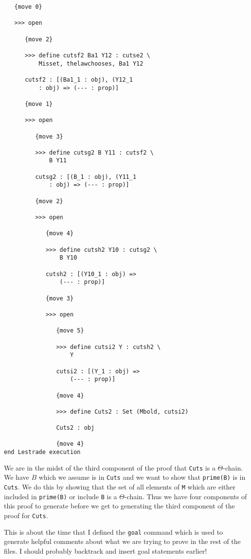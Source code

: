 \documentclass[12pt]{article}
\begin{document}
\begin{verbatim}
   {move 0}

   >>> open

      {move 2}

      >>> define cutsf2 Ba1 Y12 : cutse2 \
          Misset, thelawchooses, Ba1 Y12

      cutsf2 : [(Ba1_1 : obj), (Y12_1 
          : obj) => (--- : prop)]

      {move 1}

      >>> open

         {move 3}

         >>> define cutsg2 B Y11 : cutsf2 \
             B Y11

         cutsg2 : [(B_1 : obj), (Y11_1 
             : obj) => (--- : prop)]

         {move 2}

         >>> open

            {move 4}

            >>> define cutsh2 Y10 : cutsg2 \
                B Y10

            cutsh2 : [(Y10_1 : obj) => 
                (--- : prop)]

            {move 3}

            >>> open

               {move 5}

               >>> define cutsi2 Y : cutsh2 \
                   Y

               cutsi2 : [(Y_1 : obj) => 
                   (--- : prop)]

               {move 4}

               >>> define Cuts2 : Set (Mbold, cutsi2)

               Cuts2 : obj

               {move 4}
end Lestrade execution
\end{verbatim}

We are in the midst of the third component of the proof that {\tt Cuts} is a $\Theta$-chain.  We have $B$ which we assume is in {\tt Cuts}
and we want to show that {\tt prime(B)} is in {\tt Cuts}.  We do this by showing that the set of all elements of {\tt M} which are either included
in {\tt prime(B)} or include {\tt B} is a $\Theta$-chain.  Thus we have four components of this proof to generate before we get to generating the third component of
the proof for {\tt Cuts}.

This is about the time that I defined the {\tt goal} command which is used to generate helpful comments about what we are trying to prove in the rest of the files.  I should probably
backtrack and insert goal statements earlier!
\end{document}
